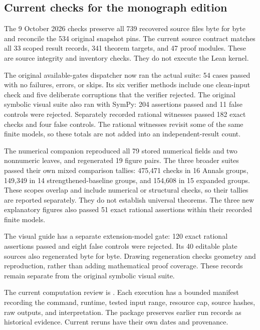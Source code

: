 \subsection{Current checks for the monograph edition}
The 9 October 2026 checks preserve all 739 recovered source files byte for byte and reconcile the 534 original snapshot pins. The current source contract matches all 33 scoped result records, 341 theorem targets, and 47 proof modules. These are source integrity and inventory checks. They do not execute the Lean kernel.

The original available-gates dispatcher now ran the actual  suite: 54 cases passed with no failures, errors, or skips. Its six verifier methods include one clean-input check and five deliberate corruptions that the verifier rejected. The original symbolic visual suite also ran with SymPy: 204 assertions passed and 11 false controls were rejected. Separately recorded rational witnesses passed 182 exact checks and four false controls. The rational witnesses revisit some of the same finite models, so these totals are not added into an independent-result count.

The numerical companion reproduced all 79 stored numerical fields and two nonnumeric leaves, and regenerated 19 figure pairs. The three broader suites passed their own mixed comparison tallies: 475,471 checks in 16 Annals groups, 149,349 in 14 strengthened-baseline groups, and 154,608 in 15 expanded groups. These scopes overlap and include numerical or structural checks, so their tallies are reported separately. They do not establish universal theorems. The three new explanatory figures also passed 51 exact rational assertions within their recorded finite models.

The visual guide has a separate extension-model gate: 120 exact rational assertions passed and eight false controls were rejected. Its 40 editable plate sources also regenerated byte for byte. Drawing regeneration checks geometry and reproduction, rather than adding mathematical proof coverage. These records remain separate from the original symbolic visual suite.

The current computation review is . Each execution has a bounded manifest recording the command, runtime, tested input range, resource cap, source hashes, raw outputs, and interpretation. The package preserves earlier run records as historical evidence. Current reruns have their own dates and provenance.

